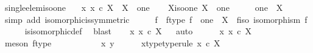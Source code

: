\begin{isabellebody}
\ single{\isacharunderscore}{\kern0pt}elem{\isacharunderscore}{\kern0pt}iso{\isacharunderscore}{\kern0pt}one{\isacharcolon}{\kern0pt}\isanewline
\ \ {\isachardoublequoteopen}{\isacharparenleft}{\kern0pt}{\isasymexists}{\isacharbang}{\kern0pt}\ x{\isachardot}{\kern0pt}\ x\ {\isasymin}\isactrlsub c\ X{\isacharparenright}{\kern0pt}\ {\isasymlongleftrightarrow}\ X\ {\isasymcong}\ one{\isachardoublequoteclose}\isanewline
%
\isadelimproof
%
\endisadelimproof
%
\isatagproof
{}\isamarkupfalse%
\isanewline
\ \ \isamarkupfalse%
\ X{\isacharunderscore}{\kern0pt}iso{\isacharunderscore}{\kern0pt}one{\isacharcolon}{\kern0pt}\ {\isachardoublequoteopen}X\ {\isasymcong}\ one{\isachardoublequoteclose}\isanewline
\ \ \isamarkupfalse%
\ \isamarkupfalse%
\ {\isachardoublequoteopen}one\ {\isasymcong}\ X{\isachardoublequoteclose}\isanewline
\ \ \ \ \isamarkupfalse%
\ {\isacharparenleft}{\kern0pt}simp\ add{\isacharcolon}{\kern0pt}\ isomorphic{\isacharunderscore}{\kern0pt}is{\isacharunderscore}{\kern0pt}symmetric{\isacharparenright}{\kern0pt}\isanewline
\ \ \isamarkupfalse%
\ \isamarkupfalse%
\ f\ \ f{\isacharunderscore}{\kern0pt}type{\isacharcolon}{\kern0pt}\ {\isachardoublequoteopen}f\ {\isacharcolon}{\kern0pt}\ one\ {\isasymrightarrow}\ X{\isachardoublequoteclose}\ \ f{\isacharunderscore}{\kern0pt}iso{\isacharcolon}{\kern0pt}\ {\isachardoublequoteopen}isomorphism\ f{\isachardoublequoteclose}\isanewline
\ \ \ \ \isamarkupfalse%
\ is{\isacharunderscore}{\kern0pt}isomorphic{\isacharunderscore}{\kern0pt}def\ \isamarkupfalse%
\ blast\isanewline
\ \ \isamarkupfalse%
\ {\isachardoublequoteopen}{\isasymexists}{\isacharbang}{\kern0pt}x{\isachardot}{\kern0pt}\ x\ {\isasymin}\isactrlsub c\ X{\isachardoublequoteclose}\isanewline
\ \ \isamarkupfalse%
{\isacharparenleft}{\kern0pt}auto{\isacharparenright}{\kern0pt}\isanewline
\ \ \ \ \isamarkupfalse%
\ {\isachardoublequoteopen}{\isasymexists}x{\isachardot}{\kern0pt}\ x\ {\isasymin}\isactrlsub c\ X{\isachardoublequoteclose}\isanewline
\ \ \ \ \ \ \isamarkupfalse%
\ {\isacharparenleft}{\kern0pt}meson\ f{\isacharunderscore}{\kern0pt}type{\isacharparenright}{\kern0pt}\isanewline
\ \ \isamarkupfalse%
\ \ \isanewline
\ \ \ \ \isamarkupfalse%
\ x\ y\isanewline
\ \ \ \ \isamarkupfalse%
\ x{\isacharunderscore}{\kern0pt}type{\isacharbrackleft}{\kern0pt}type{\isacharunderscore}{\kern0pt}rule{\isacharbrackright}{\kern0pt}{\isacharcolon}{\kern0pt}\ {\isachardoublequoteopen}x\ {\isasymin}\isactrlsub c\ X{\isachardoublequoteclose}\isanewline

\end{isabellebody}
